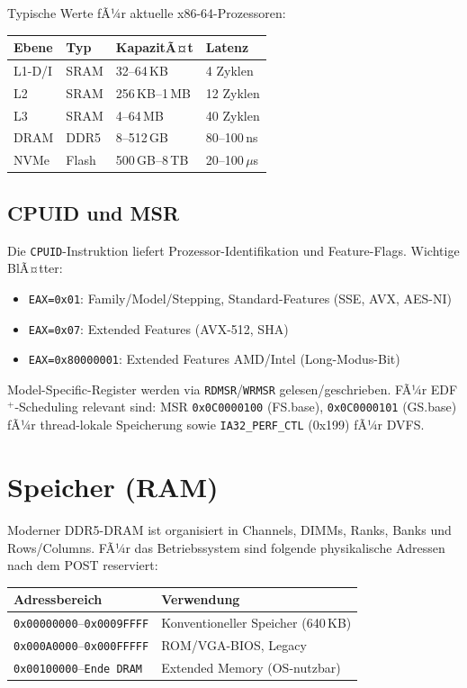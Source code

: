 ﻿\documentclass[a4paper,12pt]{scrreprt}
\theoremstyle{definition}
\begin{document}
	Typische Werte fÃ¼r aktuelle x86-64-Prozessoren:
	
	\begin{center}
		\begin{tabular}{llll}
			\toprule
			Ebene & Typ & KapazitÃ¤t & Latenz \\
			\midrule
			L1-D/I & SRAM & 32--64\,KB & 4 Zyklen \\
			L2     & SRAM & 256\,KB--1\,MB & 12 Zyklen \\
			L3     & SRAM & 4--64\,MB & 40 Zyklen \\
			DRAM   & DDR5 & 8--512\,GB & 80--100\,ns \\
			NVMe   & Flash & 500\,GB--8\,TB & 20--100\,$\mu$s \\
			\bottomrule
		\end{tabular}
	\end{center}
	
	\subsection{CPUID und MSR}
	
	Die \texttt{CPUID}-Instruktion liefert Prozessor-Identifikation und
	Feature-Flags. Wichtige BlÃ¤tter:
	\begin{itemize}
		\item \texttt{EAX=0x01}: Family/Model/Stepping, Standard-Features (SSE, AVX, AES-NI)
		\item \texttt{EAX=0x07}: Extended Features (AVX-512, SHA)
		\item \texttt{EAX=0x80000001}: Extended Features AMD/Intel (Long-Modus-Bit)
	\end{itemize}
	
	Model-Specific-Register werden via \texttt{RDMSR}/\texttt{WRMSR}
	gelesen/geschrieben. FÃ¼r EDF$^+$-Sche\-duling relevant sind:
	MSR \texttt{0x0C0000100} (FS.base), \texttt{0x0C0000101} (GS.base) fÃ¼r
	thread-lokale Speicherung sowie \texttt{IA32\_PERF\_CTL} (0x199) fÃ¼r DVFS.
	
	\section{Speicher (RAM)}
	
	Moderner DDR5-DRAM ist organisiert in Channels, DIMMs, Ranks, Banks und
	Rows/Columns. FÃ¼r das Betriebssystem sind folgende physikalische Adressen
	nach dem POST reserviert:
	
	\begin{center}
		\begin{tabular}{ll}
			\toprule
			Adressbereich & Verwendung \\
			\midrule
			\texttt{0x00000000}--\texttt{0x0009FFFF} & Konventioneller Speicher (640\,KB) \\
			\texttt{0x000A0000}--\texttt{0x000FFFFF} & ROM/VGA-BIOS, Legacy \\
			\texttt{0x00100000}--\texttt{Ende DRAM} & Extended Memory (OS-nutzbar) \\
			\bottomrule
		\end{tabular}
	\end{center}
	
\end{document}
